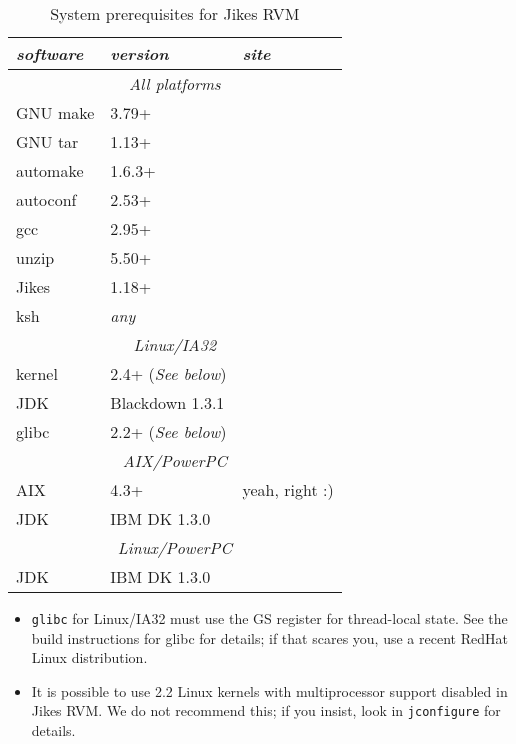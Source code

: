 \begin{table}[h]
\begin{center}
\begin{tabular}{|l|l|l|} \hline\hline
{\em software} & {\em version} & {\em site} \\ \hline
\multicolumn{3}{|c|}{\em All platforms}                     \\ \hline
GNU make       & 3.79+    & \xlink{\tt \makeURL}{\makeURL}         \\ 
GNU tar        & 1.13+    & \xlink{\tt \tarURL}{\tarURL}           \\ 
automake       & 1.6.3+   & \xlink{\tt \automakeURL}{\automakeURL} \\
autoconf       & 2.53+    & \xlink{\tt \autoconfURL}{\autoconfURL} \\
gcc            & 2.95+    & \xlink{\tt \gccURL}{\gccURL}           \\
unzip          & 5.50+    & \xlink{\tt \unzipURL}{\unzipURL}       \\
Jikes          & 1.18+    & \xlink{\tt \jikesURL}{\jikesURL}       \\
ksh            & {\em any}& \xlink{\tt \kshURL}{\kshURL}	   \\ \hline
\multicolumn{3}{|c|}{\em Linux/IA32}                      \\ \hline
kernel         & 2.4+ ({\em See below}) & \xlink{\tt \linuxKernelURL}{\linuxKernelURL} \\
JDK            & Blackdown 1.3.1 & \xlink{\tt \BlackdownURL}{\BlackdownURL} \\
glibc          & 2.2+ ({\em See below}) & \xlink{\tt \glibcURL}{\glibcURL} \\ \hline
\multicolumn{3}{|c|}{\em AIX/PowerPC}                     \\ \hline
AIX            & 4.3+     & yeah, right :)                         \\
JDK            & IBM DK 1.3.0 & \xlink{\tt \AIXJdkURL}{\AIXJdkURL} \\ \hline
\multicolumn{3}{|c|}{\em Linux/PowerPC}                      \\ \hline
JDK            & IBM DK 1.3.0    & \xlink{\tt \linuxPPCJDKURL}{\linuxPPCJDKURL} \\
\hline\hline 
\end{tabular}
\begin{itemize}
\item {\tt glibc} for Linux/IA32 must use the GS register for
thread-local state.  See the build instructions for glibc for details;
if that scares you, use a recent RedHat Linux distribution.
\item It is possible to use 2.2 Linux kernels with multiprocessor
support disabled in Jikes RVM.  We do not recommend this; if you
insist, look in {\tt jconfigure} for details.
\end{itemize}
\end{center}
\caption{System prerequisites for Jikes RVM}
\label{prereqs}
\end{table}

